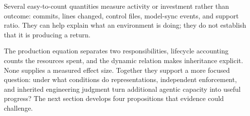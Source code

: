 Several easy-to-count quantities measure activity or investment rather than outcome: commits, lines changed, control files, model-sync events, and support ratio. They can help explain what an environment is doing; they do not establish that it is producing a return.


The production equation separates two responsibilities, lifecycle accounting counts the resources spent, and the dynamic relation makes inheritance explicit. None supplies a measured effect size. Together they support a more focused question: under what conditions do representations, independent enforcement, and inherited engineering judgment turn additional agentic capacity into useful progress? The next section develops four propositions that evidence could challenge.
